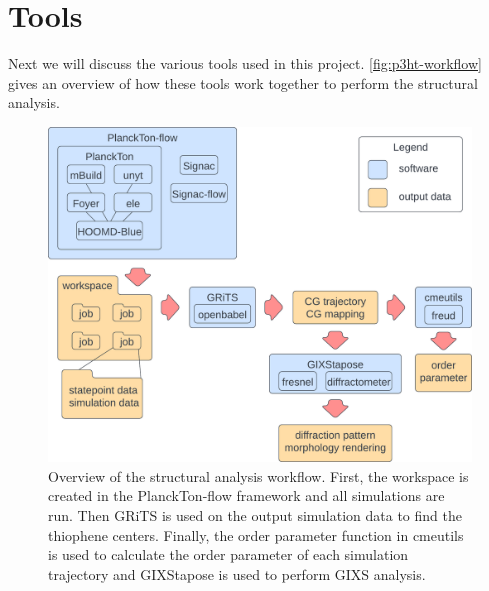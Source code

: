 \section{Tools}

Next we will discuss the various tools used in this project. \autoref{fig:p3ht-workflow} gives an overview of how these tools work together to perform the structural analysis.
\begin{figure}[h!]
    \centering
    \includegraphics[width=0.8\linewidth]{figures/p3ht_val/workflow.png}
    \caption{Overview of the structural analysis workflow. First, the workspace is created in the PlanckTon-flow framework and all simulations are run. Then GRiTS is used on the output simulation data to find the thiophene centers. Finally, the order parameter function in cmeutils is used to calculate the order parameter of each simulation trajectory and GIXStapose is used to perform GIXS analysis.}\label{fig:p3ht-workflow}
\end{figure}

